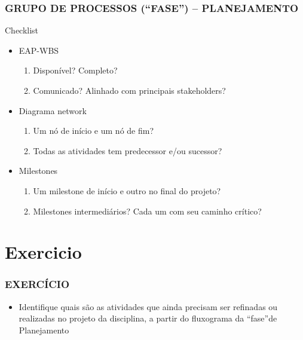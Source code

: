 \begin{frame}
 \frametitle{GRUPO DE PROCESSOS (“FASE”) – PLANEJAMENTO}
Checklist
  \begin{itemize}
   \item EAP-WBS
    \begin{enumerate}
     \item Disponível? Completo?
     \item Comunicado? Alinhado com principais stakeholders?
    \end{enumerate}
    \item Diagrama network
    \begin{enumerate}
     \item Um nó de início e um nó de fim?
     \item Todas as atividades tem predecessor e/ou sucessor?
    \end{enumerate}
    \item Milestones
    \begin{enumerate}
     \item Um milestone de início e outro no final do projeto?
     \item Milestones intermediários? Cada um com seu caminho crítico?
    \end{enumerate}

   \end{itemize}
\end{frame}

\section{Exercicio}
\begin{frame}
 \frametitle{EXERCÍCIO}
 \begin{itemize}
  \item Identifique quais são as atividades que ainda precisam ser refinadas ou realizadas no projeto da disciplina, a partir do fluxograma da “fase”de Planejamento
 \end{itemize}

\end{frame}
